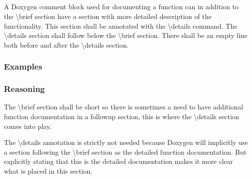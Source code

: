 \subsection*{\doxygenRule{}}

A Doxygen comment block used for documenting a function can in addition to the \textbackslash brief section have a section with more detailed description of the functionality. This section shall be annotated with the \textbackslash details command. The \textbackslash details section shall follow below the \textbackslash brief section. There shall be an empty line both before and after the \textbackslash details section.

\subsubsection*{Examples}

\noindent
\begin{minipage}[t]{0.47\textwidth}
    
\end{minipage}\hfill
\begin{minipage}[t]{0.47\textwidth}
    
\end{minipage}

\subsubsection*{Reasoning}

The \textbackslash brief section shall be short so there is sometimes a need to have additional function documentation in a followup section, this is where the \textbackslash details section comes into play.

The \textbackslash details annotation is strictly not needed because Doxygen will implicitly use a section following the \textbackslash brief section as the detailed function documentation. But explicitly stating that this is the detailed documentation makes it more clear what is placed in this section.
